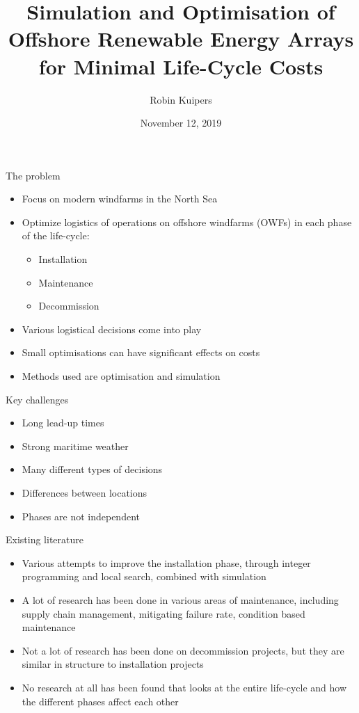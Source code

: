 \documentclass{beamer}
\title[Logistical Optimisation for Offshore Windfarms]{Simulation and Optimisation of Offshore Renewable Energy Arrays for Minimal Life-Cycle Costs}
\author{Robin Kuipers}
\date{November 12, 2019}
\begin{document}
\begin{frame}
  \titlepage
\end{frame}

\begin{frame}{The problem}
  \begin{itemize}
  	\item Focus on modern windfarms in the North Sea
  	\item Optimize logistics of operations on offshore windfarms (OWFs) in each phase of the life-cycle:
  	\begin{itemize}
  		\item Installation
  		\item Maintenance
  		\item Decommission
  	\end{itemize}
  	\item Various logistical decisions come into play
  	\item Small optimisations can have significant effects on costs
  	\item Methods used are optimisation and simulation
  \end{itemize}
\end{frame}


\begin{frame}{Key challenges}
  \begin{itemize}
  	\item Long lead-up times
  	\item Strong maritime weather
  	\item Many different types of decisions
  	\item Differences between locations
  	\item Phases are not independent
  \end{itemize}
\end{frame}


\begin{frame}{Existing literature}
   \begin{itemize}
  	\item Various attempts to improve the installation phase, through integer programming and local search, combined with simulation
  	\item A lot of research has been done in various areas of maintenance, including supply chain management, mitigating failure rate, condition based maintenance
  	\item Not a lot of research has been done on decommission projects, but they are similar in structure to installation projects
  	\item No research at all has been found that looks at the entire life-cycle and how the different phases affect each other
  \end{itemize}
\end{frame}
\end{document}
